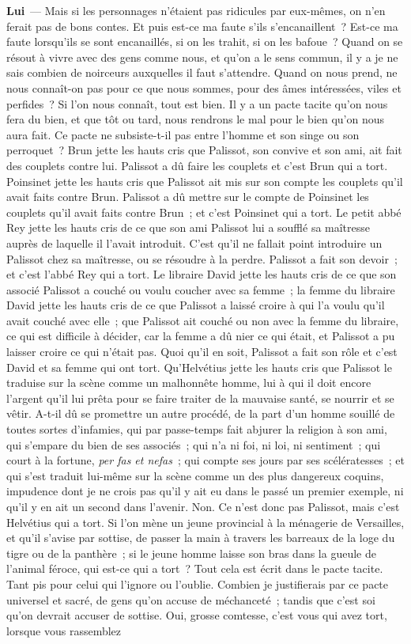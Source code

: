 \documentclass[french,twoside]{book} %
\newcommand{\labelchar}[1]{\textbf{\color{rubric} #1}}
\begin{document}
\labelchar{Lui} — Mais si les personnages n’étaient pas ridicules par eux-mêmes, on n’en ferait pas de bons contes. Et puis est-ce ma faute s’ils s’encanaillent ? Est-ce ma faute lorsqu’ils se sont encanaillés, si on les trahit, si on les bafoue ? Quand on se résout à vivre avec des gens comme nous, et qu’on a le sens commun, il y a je ne sais combien de noirceurs auxquelles il faut s’attendre. Quand on nous prend, ne nous connaît-on pas pour ce que nous sommes, pour des âmes intéressées, viles et perfides ? Si l’on nous connaît, tout est bien. Il y a un pacte tacite qu’on nous fera du bien, et que tôt ou tard, nous rendrons le mal pour le bien qu’on nous aura fait. Ce pacte ne subsiste-t-il pas entre l’homme et son singe ou son perroquet ? Brun jette les hauts cris que Palissot, son convive et son ami, ait fait des couplets contre lui. Palissot a dû faire les couplets et c’est Brun qui a tort. Poinsinet jette les hauts cris que Palissot ait mis sur son compte les couplets qu’il avait faits contre Brun. Palissot a dû mettre sur le compte de Poinsinet les couplets qu’il avait faits contre Brun ; et c’est Poinsinet qui a tort. Le petit abbé Rey jette les hauts cris de ce que son ami Palissot lui a soufflé sa maîtresse auprès de laquelle il l’avait introduit. C’est qu’il ne fallait point introduire un Palissot chez sa maîtresse, ou se résoudre à la perdre. Palissot a fait son devoir ; et c’est l’abbé Rey qui a tort. Le libraire David jette les hauts cris de ce que son associé Palissot a couché ou voulu coucher avec sa femme ; la femme du libraire David jette les hauts cris de ce que Palissot a laissé croire à qui l’a voulu qu’il avait couché avec elle ; que Palissot ait couché ou non avec la femme du libraire, ce qui est difficile à décider, car la femme a dû nier ce qui était, et Palissot a pu laisser croire ce qui n’était pas. Quoi qu’il en soit, Palissot a fait son rôle et c’est David et sa femme qui ont tort. Qu’Helvétius jette les hauts cris que Palissot le traduise sur la scène comme un malhonnête homme, lui à qui il doit encore l’argent qu’il lui prêta pour se faire traiter de la mauvaise santé, se nourrir et se vêtir. A-t-il dû se promettre un autre procédé, de la part d’un homme souillé de toutes sortes d’infamies, qui par passe-temps fait abjurer la religion à son ami, qui s’empare du bien de ses associés ; qui n’a ni foi, ni loi, ni sentiment ; qui court à la fortune, \emph{per fas et nefas} ; qui compte ses jours par ses scélératesses ; et qui s’est traduit lui-même sur la scène comme un des plus dangereux coquins, impudence dont je ne crois pas qu’il y ait eu dans le passé un premier exemple, ni qu’il y en ait un second dans l’avenir. Non. Ce n’est donc pas Palissot, mais c’est Helvétius qui a tort. Si l’on mène un jeune provincial à la ménagerie de Versailles, et qu’il s’avise par sottise, de passer la main à travers les barreaux de la loge du tigre ou de la panthère ; si le jeune homme laisse son bras dans la gueule de l’animal féroce, qui est-ce qui a tort ? Tout cela est écrit dans le pacte tacite. Tant pis pour celui qui l’ignore ou l’oublie. Combien je justifierais par ce pacte universel et sacré, de gens qu’on accuse de méchanceté ; tandis que c’est soi qu’on devrait accuser de sottise. Oui, grosse comtesse, c’est vous qui avez tort, lorsque vous rassemblez 
\end{document}
